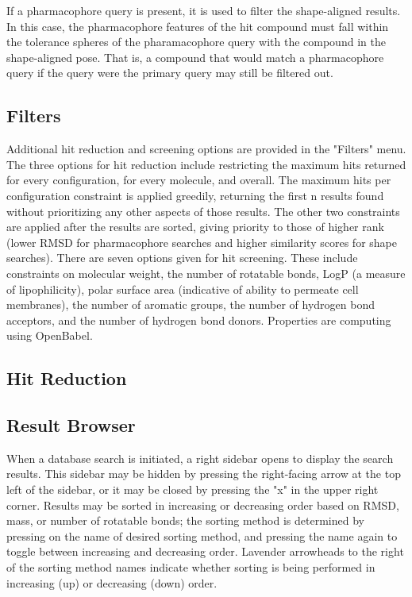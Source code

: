 If a pharmacophore query is present, it is used to filter the shape-aligned results. In this case, the pharmacophore features of the hit compound must fall within the tolerance spheres of the pharamacophore query with the compound in the shape-aligned pose. That is, a compound that would match a pharmacophore query if the query were the primary query may still be filtered out.
 
\subsection{Filters}
Additional hit reduction and screening options are provided in the "Filters" menu. The three options for hit reduction include restricting the maximum hits returned for every configuration, for every molecule, and overall. The maximum hits per configuration constraint is applied greedily, returning the first n results found without prioritizing any other aspects of those results. The other two constraints are applied after the results are sorted, giving priority to those of higher rank (lower RMSD for pharmacophore searches and higher similarity scores for shape searches). There are seven options given for hit screening. These include constraints on molecular weight, the number of rotatable bonds, LogP (a measure of lipophilicity), polar surface area (indicative of ability to permeate cell membranes), the number of aromatic groups, the number of hydrogen bond acceptors, and the number of hydrogen bond donors. Properties are computing using OpenBabel. 

\subsection{Hit Reduction}

\subsection{Result Browser}
When a database search is initiated, a right sidebar opens to display the search results. This sidebar may be hidden by pressing the right-facing arrow at the top left of the sidebar, or it may be closed by pressing the "x" in the upper right corner. Results may be sorted in increasing or decreasing order based on RMSD, mass, or number of rotatable bonds; the sorting method is determined by pressing on the name of desired sorting method, and pressing the name again to toggle between increasing and decreasing order. Lavender arrowheads to the right of the sorting method names indicate whether sorting is being performed in increasing (up) or decreasing (down) order. 